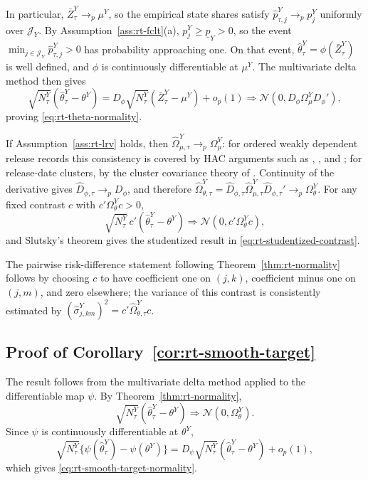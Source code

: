 \documentclass[a4paper, 12pt]{article}
\theoremstyle{plain}
\theoremstyle{remark}
\newcommand{\1}{\mathbf{1}}
\begin{document}
In particular, \(\bar Z^Y_\tau\to_p\mu^Y\), so the empirical state shares satisfy \(\widehat p^Y_{\tau,j}\to_p p^Y_j\) uniformly over \(\mathcal J_Y\). By Assumption~\ref{ass:rt-fclt}(a), \(p^Y_j\geq\underline p_Y>0\), so the event \(\min_{j\in\mathcal J_Y}\widehat p^Y_{\tau,j}>0\) has probability approaching one. On that event, \(\widehat\theta^Y_\tau=\phi(\bar Z^Y_\tau)\) is well defined, and \(\phi\) is continuously differentiable at \(\mu^Y\). The multivariate delta method then gives
\begin{equation*}
    \sqrt{N^Y_\tau}\left(\widehat\theta^Y_\tau-\theta^Y\right)
    =
    D_\phi\sqrt{N^Y_\tau}\left(\bar Z^Y_\tau-\mu^Y\right)+o_p(1)
    \Rightarrow
    \mathcal N(0,D_\phi\Omega^Y_\mu D_\phi'),
\end{equation*}
proving \eqref{eq:rt-theta-normality}.

If Assumption~\ref{ass:rt-lrv} holds, then \(\widehat\Omega^Y_{\mu,\tau}\to_p\Omega^Y_\mu\): for ordered weakly dependent release records this consistency is covered by HAC arguments such as \citet{NeweyWest1987}, \citet{Andrews1991}, and \citet{deJongDavidson2000Econometrica}; for release-date clusters, by the cluster covariance theory of \citet{HansenLee2019}. Continuity of the derivative gives \(\widehat D_{\phi,\tau}\to_pD_\phi\), and therefore \(\widehat\Omega^Y_{\theta,\tau}=\widehat D_{\phi,\tau}\widehat\Omega^Y_{\mu,\tau}\widehat D_{\phi,\tau}'\to_p\Omega^Y_\theta\). For any fixed contrast \(c\) with \(c'\Omega^Y_\theta c>0\),
\begin{equation*}
    \sqrt{N^Y_\tau}\,c'(\widehat\theta^Y_\tau-\theta^Y)
    \Rightarrow
    \mathcal N(0,c'\Omega^Y_\theta c),
\end{equation*}
and Slutsky's theorem gives the studentized result in \eqref{eq:rt-studentized-contrast}.

The pairwise risk-difference statement following Theorem~\ref{thm:rt-normality} follows by choosing \(c\) to have coefficient one on \((j,k)\), coefficient minus one on \((j,m)\), and zero elsewhere; the variance of this contrast is consistently estimated by \((\widehat\sigma^Y_{j,km})^2=c'\widehat\Omega^Y_{\theta,\tau}c\).

\subsection*{Proof of Corollary~\ref{cor:rt-smooth-target}}
The result follows from the multivariate delta method applied to the differentiable map \(\psi\). By Theorem~\ref{thm:rt-normality},
\begin{equation*}
    \sqrt{N^Y_\tau}(\widehat\theta^Y_\tau-\theta^Y)
    \Rightarrow
    \mathcal N(0,\Omega^Y_\theta).
\end{equation*}
Since \(\psi\) is continuously differentiable at \(\theta^Y\),
\begin{equation*}
    \sqrt{N^Y_\tau}\{\psi(\widehat\theta^Y_\tau)-\psi(\theta^Y)\}
    =
    D_\psi\sqrt{N^Y_\tau}(\widehat\theta^Y_\tau-\theta^Y)+o_p(1),
\end{equation*}
which gives \eqref{eq:rt-smooth-target-normality}.
\end{document}
